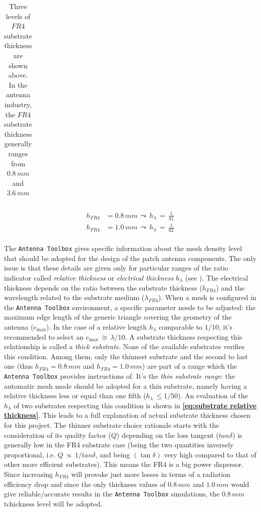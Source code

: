 \documentclass[10pt,a4paper,twocolumn]{article}
\begin{document}
{\begin{table}[bt!]
\begin{center}
{\begin{tabular}{||m{2.5 cm}|m{2.5 cm}|m{2.5 cm}||}
		\end{tabular}}
		\caption{Three levels of $FR4$ substrate thickness are shown above. In the antenna industry, the $FR4$ substrate thickness generally ranges from $0.8\,mm$ and $3.6\,mm$}
		\label{table:substrate tchickness}\end{center}\end{table}
\begin{equation}\begin{aligned}
		h_{FR4} &= 0.8\,mm\,\leadsto\,h_{\lambda}\,=\,\frac{1}{81}\\	h_{FR4} &= 1.0\,mm\,\leadsto\,h_{\lambda}\,=\,\frac{1}{62}\\
	\end{aligned}
	\label{eq:substrate relative thickness}
\end{equation}

The \texttt{\color{Mahogany}Antenna Toolbox} gives specific
information about the mesh density level that should be adopted for the design of the patch antenna components. The only issue is that these details are given only for particular ranges of the ratio indicator called \emph{relative thickness} or \emph{electrical thickness} $h_{\lambda}$ (see \textbf{\cite{makarov}}). The electrical thickness depends on the ratio between the substrate thickness ($h_{FR4}$) and the wavelength related to the substrate medium ($\lambda_{FR4}$). When a mesh is configured in the \texttt{\color{Mahogany}Antenna Toolbox} environment, a specific parameter needs to be adjusted: the maximum edge length of the generic triangle covering the geometry of the antenna ($e_{\max}$). In the case of a relative length $h_\lambda$ comparable to $1/10$, it's recommended to select an $e_{\max}\,\cong\,\lambda/10$. A substrate thickness respecting this relationship is called a \emph{thick substrate}. None of the available substrates verifies this condition. Among them, only the thinnest substrate and the second to last one (thus $h_{FR4}=0.8\,mm$ and $h_{FR4}=1.0\,mm$) are part of a range which the \texttt{\color{Mahogany}Antenna Toolbox} provides instructions of. It's the \emph{thin substrate range}: the automatic mesh mode should be adopted for a thin substrate, namely having a relative thickness less or equal than one fifth ($h_\lambda\,\leq{1/50}$). An evaluation of the $h_\lambda$ of two substrates respecting this condition is shown in \textbf{\cref{eq:substrate relative thickness}}. This leads to a full explanation of actual substrate thickness chosen for this project. The thinner substrate choice rationale starts with the consideration of its quality factor ($Q$) depending on the loss tangent ($tan\delta$) is generally low in the FR4 substrate case (being the two quantities inversely proportional, i.e. $Q\,\propto\,1/tan\delta$, and being $(\tan\delta)$ very high compared to that of other more efficient substrates). This means the FR4 is a big power dispersor. Since increasing $h_{FR4}$ will provoke just more losses in terms of a radiation efficiency drop and since the only thickness values of $0.8\,mm$ and $1.0\,mm$ would give reliable/accurate results in the \texttt{\color{Mahogany}Antenna Toolbox} simulations, the $0.8\,mm$ tchickness level will be adopted. 
}
\end{document}
